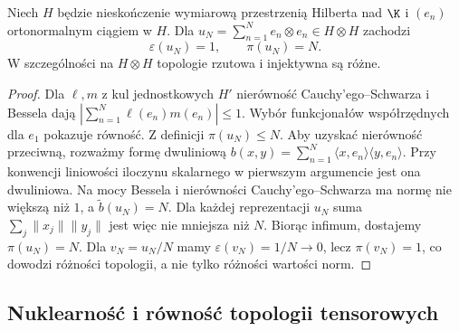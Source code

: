 \begin{twierdzenie}
\label{thm:hilbert-norms24}
Niech $H$ będzie nieskończenie wymiarową przestrzenią Hilberta
nad $\K$ i $(e_n)$ ortonormalnym ciągiem w $H$. Dla
$u_N=\sum_{n=1}^N e_n\otimes e_n\in H\otimes H$ zachodzi
\[ \varepsilon(u_N)=1,\qquad \pi(u_N)=N. \]
W szczególności na $H\otimes H$ topologie rzutowa i
injektywna są różne.
\end{twierdzenie}
\begin{proof}
Dla $\ell,m$ z kul jednostkowych $H'$ nierówność
Cauchy'ego--Schwarza i Bessela dają
$|\sum_{n=1}^N\ell(e_n)m(e_n)|\le1$. Wybór funkcjonałów
współrzędnych dla $e_1$ pokazuje równość. Z definicji
$\pi(u_N)\le N$. Aby uzyskać nierówność przeciwną,
rozważmy formę dwuliniową
$b(x,y)=\sum_{n=1}^N\langle x,e_n\rangle\langle y,e_n\rangle$.
Przy konwencji liniowości iloczynu skalarnego w pierwszym
argumencie jest ona dwuliniowa. Na mocy Bessela i
nierówności Cauchy'ego--Schwarza ma normę nie większą niż $1$,
a $\widetilde b(u_N)=N$. Dla każdej reprezentacji $u_N$ suma
$\sum_j\|x_j\|\|y_j\|$ jest więc nie mniejsza niż $N$.
Biorąc infimum, dostajemy $\pi(u_N)=N$.
Dla $v_N=u_N/N$ mamy $\varepsilon(v_N)=1/N\to0$,
lecz $\pi(v_N)=1$, co dowodzi różności topologii,
a nie tylko różności wartości norm.
\end{proof}

\subsection{Nuklearność i równość topologii tensorowych}


